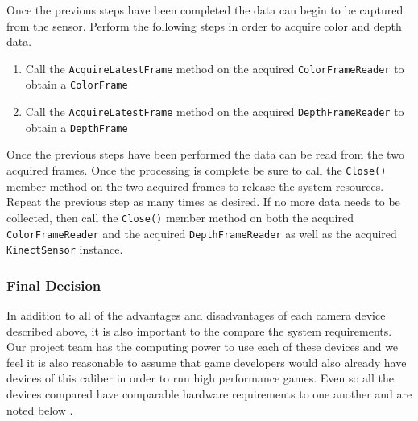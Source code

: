 \documentclass[12pt]{article}
\providecommand{\tightlist}{%
  \setlength{\itemsep}{0pt}\setlength{\parskip}{0pt}}
\begin{document}
Once the previous steps have been completed the data can begin to be
captured from the sensor. Perform the following steps in order to
acquire color and depth data.

\begin{enumerate}
\def\labelenumi{\arabic{enumi}.}
\tightlist
\item
  Call the \texttt{AcquireLatestFrame} method on the acquired
  \texttt{ColorFrameReader} to obtain a \texttt{ColorFrame}
\item
  Call the \texttt{AcquireLatestFrame} method on the acquired
  \texttt{DepthFrameReader} to obtain a \texttt{DepthFrame}
\end{enumerate}

Once the previous steps have been performed the data can be read from
the two acquired frames. Once the processing is complete be sure to call
the \texttt{Close()} member method on the two acquired frames to release
the system resources. Repeat the previous step as many times as desired.
If no more data needs to be collected, then call the \texttt{Close()}
member method on both the acquired \texttt{ColorFrameReader} and the
acquired \texttt{DepthFrameReader} as well as the acquired
\texttt{KinectSensor} instance.

\subsubsection{Final Decision}\label{final-decision-1}

In addition to all of the advantages and disadvantages of each camera
device described above, it is also important to the compare the system
requirements. Our project team has the computing power to use each of
these devices and we feel it is also reasonable to assume that game
developers would also already have devices of this caliber in order to
run high performance games. Even so all the devices compared have
comparable hardware requirements to one another and are noted below
\autocites{ViveRequirements}{KinectRequirements}{IntelRequirements}.
\end{document}
